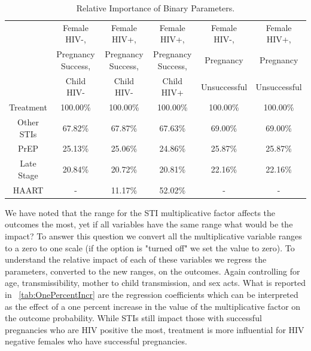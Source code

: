 \documentclass[11pt]{nih_mod}
\begin{document}
\begin{table}[H]	
\begin{center}
\begin{tabular}{|c|c|c|c|c|c|}
\hline
 & Female HIV-,  & Female HIV+, & Female HIV+, & Female HIV-, & Female HIV+,\\ 
 & Pregnancy Success,& Pregnancy Success,&Pregnancy Success,& Pregnancy& Pregnancy\\ 
 & Child HIV-&Child HIV-&Child HIV+&Unsuccessful&Unsuccessful\\ 
\hline
\hline
Treatment & 100.00\% & 100.00\% & 100.00\% & 100.00\% & 100.00\%\\ 
Other STIs & 67.82\% & 67.87\% & 67.63\% & 69.00\% & 69.00\%\\ 
PrEP & 25.13\% & 25.06\% & 24.86\% & 25.87\% & 25.87\%\\ 
Late Stage & 20.84\% & 20.72\% & 20.81\% & 22.16\% & 22.16\%\\ 
HAART & - & 11.17\% & 52.02\% & - & -\\
\hline
\end{tabular}
	\caption{Relative Importance of Binary Parameters. \label{tab:binaryImp}}
\end{center}
\end{table}

We have noted that the range for the STI multiplicative factor affects the outcomes the most, yet if all variables have the same range what would be the impact?  To answer this question we convert all the multiplicative variable ranges to a zero to one scale (if the option is "turned off" we set the value to zero).  To understand the relative impact of each of these variables we regress the parameters, converted to the new ranges, on the outcomes.  Again controlling for age, transmissibility, mother to child transmission, and sex acts.  What is reported in ~\ref{tab:OnePercentIncr} are the regression coefficients which can be interpreted as the effect of a one percent increase in the value of the multiplicative factor on the outcome probability.  While STIs still impact those with successful pregnancies who are HIV positive the most, treatment is more influential for HIV negative females who have successful pregnancies.
\end{document}
